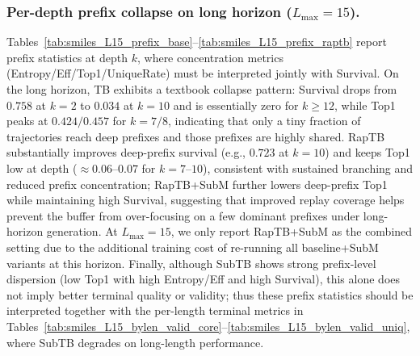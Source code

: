 \documentclass{article}
\theoremstyle{plain}
\theoremstyle{definition}
\theoremstyle{remark}
\begin{document}
\subsubsection{Per-depth prefix collapse on long horizon ($L_{\max}=15$).}
\label{app:results_smiles_L15_prefix}
Tables~\ref{tab:smiles_L15_prefix_base}--\ref{tab:smiles_L15_prefix_raptb} report prefix statistics at depth $k$, where concentration metrics (Entropy/Eff/Top1/UniqueRate) must be interpreted jointly with Survival.
On the long horizon, TB exhibits a textbook collapse pattern: Survival drops from $0.758$ at $k{=}2$ to $0.034$ at $k{=}10$ and is essentially zero for $k\!\ge\!12$, while Top1 peaks at $0.424/0.457$ for $k{=}7/8$, indicating that only a tiny fraction of trajectories reach deep prefixes and those prefixes are highly shared.
RapTB substantially improves deep-prefix survival (e.g., $0.723$ at $k{=}10$) and keeps Top1 low at depth ($\approx0.06$--$0.07$ for $k{=}7$--$10$), consistent with sustained branching and reduced prefix concentration; RapTB+SubM further lowers deep-prefix Top1 while maintaining high Survival, suggesting that improved replay coverage helps prevent the buffer from over-focusing on a few dominant prefixes under long-horizon generation.
At $L_{\max}=15$, we only report RapTB+SubM as the combined setting due to the additional training cost of re-running all baseline+SubM variants at this horizon.
Finally, although SubTB shows strong prefix-level dispersion (low Top1 with high Entropy/Eff and high Survival), this alone does not imply better terminal quality or validity; thus these prefix statistics should be interpreted together with the per-length terminal metrics in Tables~\ref{tab:smiles_L15_bylen_valid_core}--\ref{tab:smiles_L15_bylen_valid_uniq}, where SubTB degrades on long-length performance.
\end{document}
